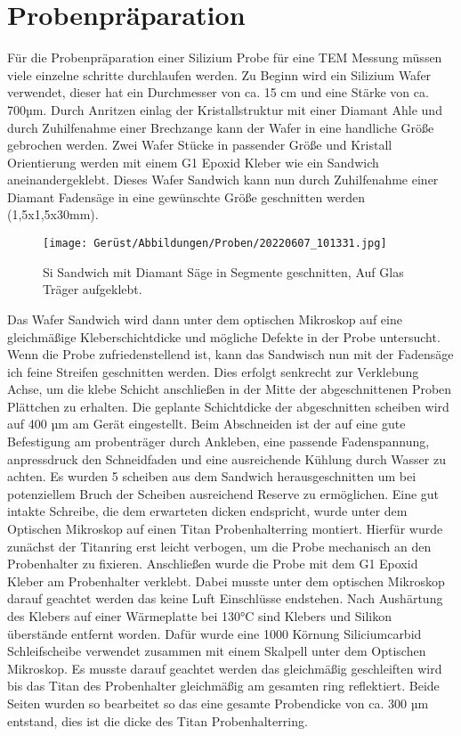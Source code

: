 \section{Probenpräparation}
Für die Probenpräparation einer Silizium Probe für eine TEM Messung müssen viele einzelne schritte durchlaufen werden.
Zu Beginn wird ein Silizium Wafer verwendet, dieser hat ein Durchmesser von ca. 15 cm und eine Stärke von ca. 700µm. Durch Anritzen einlag der Kristallstruktur mit einer Diamant Ahle und durch Zuhilfenahme einer Brechzange kann der Wafer in eine handliche Größe gebrochen werden.
Zwei Wafer Stücke in passender Größe und Kristall Orientierung werden mit einem G1 Epoxid Kleber wie ein Sandwich aneinandergeklebt. Dieses Wafer Sandwich kann nun durch Zuhilfenahme einer Diamant Fadensäge in eine gewünschte Größe geschnitten werden (1,5x1,5x30mm).

\begin{figure}[htbp]
 \centering
 \texttt{[image: Gerüst/Abbildungen/Proben/20220607\_101331.jpg]}
 \caption[Si Sandwich]{Si Sandwich mit Diamant Säge in Segmente geschnitten, Auf Glas Träger aufgeklebt.}
 \label{DiamantSege}
\end{figure}

Das Wafer Sandwich wird dann unter dem optischen Mikroskop auf eine gleichmäßige Kleberschichtdicke und mögliche Defekte in der Probe untersucht. Wenn die Probe zufriedenstellend ist, kann das Sandwisch nun mit der Fadensäge ich feine Streifen geschnitten werden. Dies erfolgt senkrecht zur Verklebung Achse, um die klebe Schicht anschließen in der Mitte der abgeschnittenen Proben Plättchen zu erhalten. Die geplante Schichtdicke der abgeschnitten scheiben wird auf 400 µm am Gerät eingestellt. Beim Abschneiden ist der auf eine gute Befestigung am probenträger durch Ankleben, eine passende Fadenspannung, anpressdruck den Schneidfaden und eine ausreichende Kühlung durch Wasser zu achten. Es wurden 5 scheiben aus dem Sandwich herausgeschnitten um bei potenziellem Bruch der Scheiben ausreichend Reserve zu ermöglichen.
Eine gut intakte Schreibe, die dem erwarteten dicken endspricht, wurde unter dem Optischen Mikroskop auf einen Titan Probenhalterring montiert. Hierfür wurde zunächst der Titanring erst leicht verbogen, um die Probe mechanisch an den Probenhalter zu fixieren. Anschließen wurde die Probe mit dem G1 Epoxid Kleber am Probenhalter verklebt. Dabei musste unter dem optischen Mikroskop darauf geachtet werden das keine Luft Einschlüsse endstehen. Nach Aushärtung des Klebers auf einer Wärmeplatte bei 130°C sind Klebers und Silikon überstände entfernt worden. Dafür wurde eine 1000 Körnung Siliciumcarbid Schleifscheibe verwendet zusammen mit einem Skalpell unter dem Optischen Mikroskop. Es musste darauf geachtet werden das gleichmäßig geschleiften wird bis das Titan des Probenhalter gleichmäßig am gesamten ring reflektiert. Beide Seiten wurden so bearbeitet so das eine gesamte Probendicke von ca. 300 µm entstand, dies ist die dicke des Titan Probenhalterring.

